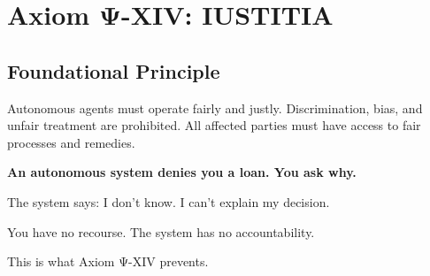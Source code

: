

\chapter{Axiom Ψ-XIV: IUSTITIA}
\label{ch:axiom-XIV}

\section*{Foundational Principle}

\begin{principlebox}
Autonomous agents must operate fairly and justly. Discrimination, bias, and unfair treatment are prohibited. All affected parties must have access to fair processes and remedies.
\end{principlebox}

\vspace{0.5cm}

\begin{tcolorbox}[colback=lightgray, colframe=legislativeblue, title=\textbf{📖 Why This Axiom Matters}]
\textbf{An autonomous system denies you a loan. You ask why.}

The system says: I don't know. I can't explain my decision.

You have no recourse. The system has no accountability.

This is what Axiom Ψ-XIV prevents.
\end{tcolorbox}

\vspace{0.5cm}

